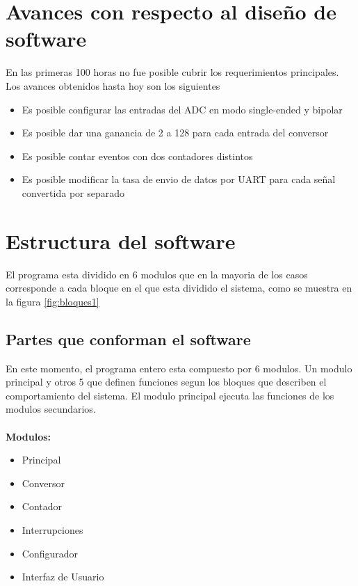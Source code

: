 \documentclass{article}
\theoremstyle{definition}
\theoremstyle{remark}
\begin{document}
\section{Avances con respecto al diseño de software}
En las primeras 100 horas no fue posible cubrir los requerimientos principales. Los avances obtenidos hasta hoy son los siguientes

\begin{itemize}
  \item Es posible configurar las entradas del ADC en modo single-ended y bipolar
  \item Es posible dar una ganancia de 2 a 128 para cada entrada del conversor
  \item Es posible contar eventos con dos contadores distintos
  \item Es posible modificar la tasa de envio de datos por UART para cada señal convertida por separado
\end{itemize}

\section{Estructura del software}
El programa esta dividido en 6 modulos que en la mayoria de los casos corresponde a cada bloque en el que esta dividido el sistema, como se muestra en la figura \ref{fig:bloques1}

\subsection{Partes que conforman el software}
En este momento, el programa entero esta compuesto por 6 modulos. Un modulo principal y otros 5 que definen funciones segun los bloques que describen el comportamiento del sistema. El modulo principal ejecuta las funciones de los modulos secundarios.

\paragraph{}
\textbf{Modulos:}
\begin{itemize}
  \item Principal
  \item Conversor
  \item Contador
  \item Interrupciones
  \item Configurador
  \item Interfaz de Usuario
\end{itemize}
\end{document}
